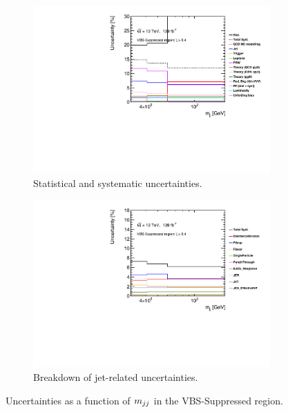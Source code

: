 \begin{figure}[!htb]
    \centering
    \begin{subfigure}{.48\textwidth}
        \centering
        \includegraphics[width=.9\linewidth]{figures/Analysis/Systematics/systematics_VBS_Suppressed.pdf}
        \caption{ Statistical and systematic uncertainties. \label{fig:sys_mjj_VBS_Suppressed_total}}
    \end{subfigure}
    \begin{subfigure}{.48\textwidth}
        \centering
        \includegraphics[width=.9\linewidth]{figures/Analysis/Systematics/jet_systematics_VBS_Suppressed.pdf}
        \caption{Breakdown of jet-related uncertainties. \label{fig:sys_mjj_VBS_Suppressed_jet} }
    \end{subfigure}
    \caption{Uncertainties as a function of $m_{jj}$ in the VBS-Suppressed region.}  \label{fig:sys_mjj_VBS_Suppressed}
\end{figure}

